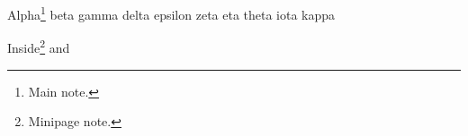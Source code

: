 \documentclass{article}
\begin{document}
Alpha\footnote{Main note.} beta gamma
delta epsilon zeta
eta theta\footnotemarkB{} iota
kappa
\begin{minipage}{4cm}Inside\footnote{Minipage note.} and\end{minipage}
\end{document}
